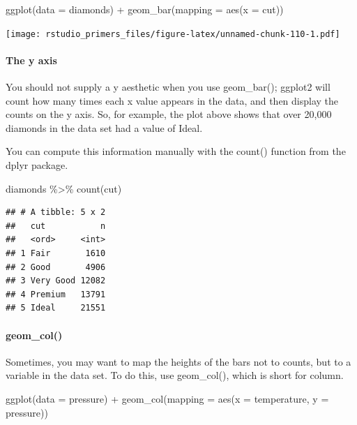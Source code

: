 \documentclass[
]{article}
\newenvironment{Shaded}{\begin{snugshade}}{\end{snugshade}}
\newcommand{\AttributeTok}[1]{\textcolor[rgb]{0.77,0.63,0.00}{#1}}
\newcommand{\FunctionTok}[1]{\textcolor[rgb]{0.00,0.00,0.00}{#1}}
\newcommand{\NormalTok}[1]{#1}
\newcommand{\SpecialCharTok}[1]{\textcolor[rgb]{0.00,0.00,0.00}{#1}}
\begin{document}
\begin{Shaded}
\begin{Highlighting}[]
\FunctionTok{ggplot}\NormalTok{(}\AttributeTok{data =}\NormalTok{ diamonds) }\SpecialCharTok{+}
  \FunctionTok{geom\_bar}\NormalTok{(}\AttributeTok{mapping =} \FunctionTok{aes}\NormalTok{(}\AttributeTok{x =}\NormalTok{ cut))}
\end{Highlighting}
\end{Shaded}

\texttt{[image: rstudio\_primers\_files/figure-latex/unnamed-chunk-110-1.pdf]}

\hypertarget{the-y-axis}{%
\paragraph{The y axis}\label{the-y-axis}}

You should not supply a y aesthetic when you use geom\_bar(); ggplot2
will count how many times each x value appears in the data, and then
display the counts on the y axis. So, for example, the plot above shows
that over 20,000 diamonds in the data set had a value of Ideal.

You can compute this information manually with the count() function from
the dplyr package.

\begin{Shaded}
\begin{Highlighting}[]
\NormalTok{diamonds }\SpecialCharTok{\%\textgreater{}\%} 
  \FunctionTok{count}\NormalTok{(cut)}
\end{Highlighting}
\end{Shaded}

\begin{verbatim}
## # A tibble: 5 x 2
##   cut           n
##   <ord>     <int>
## 1 Fair       1610
## 2 Good       4906
## 3 Very Good 12082
## 4 Premium   13791
## 5 Ideal     21551
\end{verbatim}

\hypertarget{geom_col}{%
\paragraph{geom\_col()}\label{geom_col}}

Sometimes, you may want to map the heights of the bars not to counts,
but to a variable in the data set. To do this, use geom\_col(), which is
short for column.

\begin{Shaded}
\begin{Highlighting}[]
\FunctionTok{ggplot}\NormalTok{(}\AttributeTok{data =}\NormalTok{ pressure) }\SpecialCharTok{+}
  \FunctionTok{geom\_col}\NormalTok{(}\AttributeTok{mapping =} \FunctionTok{aes}\NormalTok{(}\AttributeTok{x =}\NormalTok{ temperature, }\AttributeTok{y =}\NormalTok{ pressure))}
\end{Highlighting}
\end{Shaded}
\end{document}
